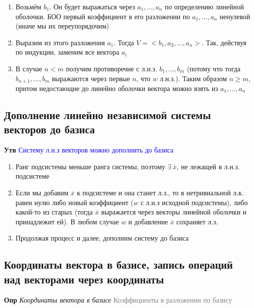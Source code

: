 \documentclass[a4paper, 14pt]{article}
\begin{document}
    \begin{enumerate}
        \item Возьмём $b_1$.
        Он будет выражаться через $a_1, \dots, a_n$ по определению линейной оболочки.
        БОО первый коэффициент в его разложении по $a_1, \dots, a_n$ ненулевой (иначе мы их переупорядочим)
        \item Выразим из этого разложения $a_1$.
        Тогда $V = <b_1, a_2, \dots, a_n>$.
        Так, действуя по индукции, заменим все вектора $a_i$
        \item В случае $n < m$ получим противоречие с л.н.з. $b_1, \dots, b_m$ (потому что тогда $b_{n+1}, \dots, b_m$
        выражаются через первые $n$, что $w$ л.н.з.).
        Таким образом $n \geq m$, притом недостающие до линейно оболочки вектора можно взять из $a_1, \dots, a_n$
    \end{enumerate}

    \subsection{Дополнение линейно независимой системы векторов до базиса}

    \textbf{Утв} \textcolor{blue}{Систему л.н.з векторов можно дополнить до базиса}

    \begin{enumerate}
        \item Ранг подсистемы меньше ранга системы, поэтому $\exists~\overline{x}$, не лежащей в л.н.з. подсистеме
        \item Если мы добавим $\overline{x}$ к подсистеме и она станет л.з., то в нетривиальной л.к. равен нулю либо
        новый коэффициент ($w$ с л.н.з исходной подсистемы), либо какой-то из старых (тогда $\overline{x}$ выражается
        через векторы линейной оболочки и принадлежит ей).
        В любом случае $w$ и добавление $\overline{x}$ сохраняет л.з.
        \item Продолжая процесс и далее, дополним систему до базиса
    \end{enumerate}

    \subsection{Координаты вектора в базисе, запись операций над векторами через координаты}

    \textbf{Опр} \textit{Координаты вектора в базисе} \textcolor{gray}{Коэффициенты в разложении по базису} \\
\end{document}
